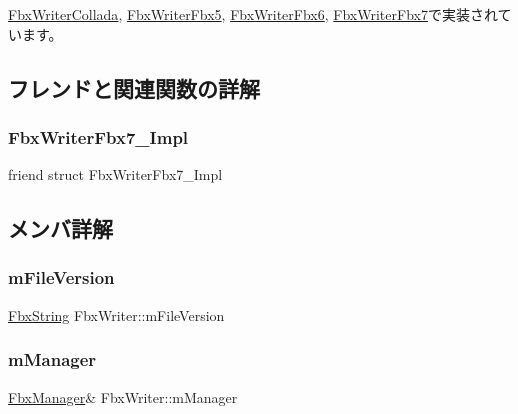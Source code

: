 \hyperlink{class_fbx_writer_collada_aaf5a632f5fa72c521d578ad17ae0aea1}{Fbx\+Writer\+Collada}, \hyperlink{class_fbx_writer_fbx5_a50a64e5e28a3ae1a89aa7107b80b7d26}{Fbx\+Writer\+Fbx5}, \hyperlink{class_fbx_writer_fbx6_a27073868a5a3c4b315e443032916d7d7}{Fbx\+Writer\+Fbx6}, \hyperlink{class_fbx_writer_fbx7_abc9fcf2cf7e1ed96f87bdc67f05f9545}{Fbx\+Writer\+Fbx7}で実装されています。



\subsection{フレンドと関連関数の詳解}
\mbox{\label{class_fbx_writer_af1c8c15ac15cf43655af7772383daefd}} 
\subsubsection{\texorpdfstring{Fbx\+Writer\+Fbx7\+\_\+\+Impl}{FbxWriterFbx7\_Impl}}
{\footnotesize\ttfamily friend struct Fbx\+Writer\+Fbx7\+\_\+\+Impl\hspace{0.3cm}{\ttfamily [friend]}}



\subsection{メンバ詳解}
\mbox{\label{class_fbx_writer_a134d9a05d8c34cae98d3c782b98ea801}} 
\subsubsection{\texorpdfstring{m\+File\+Version}{mFileVersion}}
{\footnotesize\ttfamily \hyperlink{class_fbx_string}{Fbx\+String} Fbx\+Writer\+::m\+File\+Version\hspace{0.3cm}{\ttfamily [protected]}}

\mbox{\label{class_fbx_writer_acd9ad280af8eef03970ed9ada774a731}} 
\subsubsection{\texorpdfstring{m\+Manager}{mManager}}
{\footnotesize\ttfamily \hyperlink{class_fbx_manager}{Fbx\+Manager}\& Fbx\+Writer\+::m\+Manager\hspace{0.3cm}{\ttfamily [protected]}}

